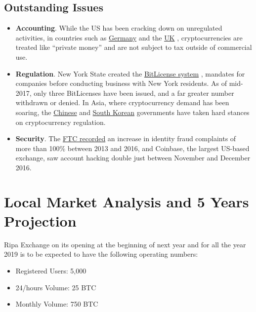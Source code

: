 	\subsection{Outstanding Issues}
		\begin{itemize}
			\item \textbf{Accounting}. While the US has been cracking down on unregulated activities, in countries such as 
			\href{https://techcrunch.com/2013/08/19/germany-recognizes-bitcoin-as-private-money-sales-tax-coming-soon/}{Germany} 
			\cite{techCrunchPrivateMoney}
			and the \href{http://www.ibtimes.co.uk/hmrc-re-classify-bitcoin-private-money-1432718}{UK}
			\cite{ibtimesPrivateMoney}, 
			cryptocurrencies are treated like ``private money'' and are not subject to tax outside of commercial use.
			\item \textbf{Regulation}. New York State created the 
			\href{https://www.wired.com/2014/07/ny_bitcoin/}{BitLicense system} \cite{wiredNYLicense}, mandates for companies 
			before conducting business with New York residents. As of mid-2017, only three BitLicenses have been issued, 
			and a far greater number withdrawn or denied. In Asia, where cryptocurrency demand has been soaring, 
			the \href{http://fortune.com/2018/01/17/china-bitcoin-cryptocurrency-crackdown/}{Chinese} 
			\cite{fortune}
			and \href{https://www.bloomberg.com/news/articles/2017-12-13/south-korea-seeks-measures-to-curb-frenzied-bitcoin-speculation}{South Korean} 
			\cite{bloombergSKBan}
			governments have taken hard stances on cryptocurrency regulation.
			\item \textbf{Security}. The 
			\href{https://www.forbes.com/sites/laurashin/2016/12/20/hackers-have-stolen-millions-of-dollars-in-bitcoin-using-only-phone-numbers/#3ac0bf1d38ba}{FTC recorded} 
			\cite{forbesBitcoinHacking} 
			an increase in identity fraud complaints of more than 100\% between 2013 and 2016, 
			and Coinbase, the largest US-based exchange, saw account hacking double just between November and December 2016.
		\end{itemize}

\section{Local Market Analysis and 5 Years Projection}
Ripa Exchange on its opening at the beginning of next year and for all the year 2019 is to be expected
to have the following operating numbers:
\begin{itemize}
	\item Registered Users: 5,000			%
	\item 24/hours Volume: 25 BTC			%
	\item Monthly Volume: 750 BTC			%
\end{itemize}

